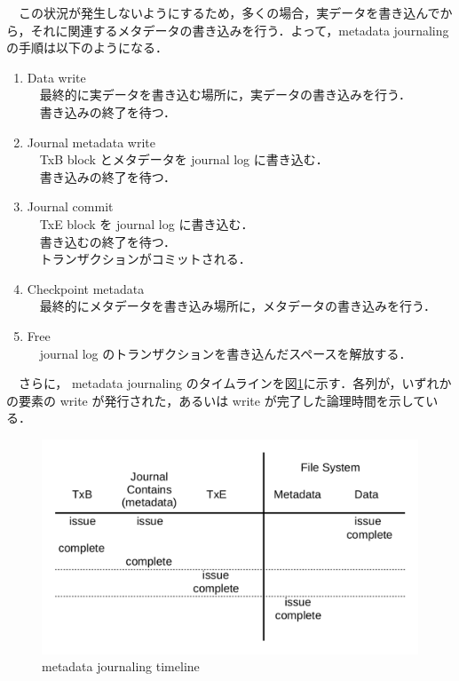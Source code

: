 \documentclass[graduation-thesis]{jsarticle}
\begin{document}
　この状況が発生しないようにするため，多くの場合，実データを書き込んでから，それに関連するメタデータの書き込みを行う．よって，metadata journaling の手順は以下のようになる．\\
\begin{enumerate}
	\item{Data write}\\
	　最終的に実データを書き込む場所に，実データの書き込みを行う．\\
	　書き込みの終了を待つ．
	\item{Journal metadata write}\\
	　TxB block とメタデータを journal log に書き込む．\\
	　書き込みの終了を待つ．
	\item{Journal commit}\\
	　TxE block を journal log に書き込む．\\
	　書き込むの終了を待つ．\\
	　トランザクションがコミットされる．
	\item{Checkpoint metadata}\\
	　最終的にメタデータを書き込み場所に，メタデータの書き込みを行う．\\
	\item{Free}\\
	　journal log のトランザクションを書き込んだスペースを解放する．\\
\end{enumerate}
　さらに， metadata journaling のタイムラインを図\ref{fig:timeline}に示す．各列が，いずれかの要素の write が発行された，あるいは write が完了した論理時間を示している．\\
\begin{figure}
	\begin{center}
		\includegraphics[width=12.0cm,clip]{images/timeline.pdf}
		\caption{metadata journaling timeline}
		\label{fig:timeline}
	\end{center}
\end{figure}
\end{document}
